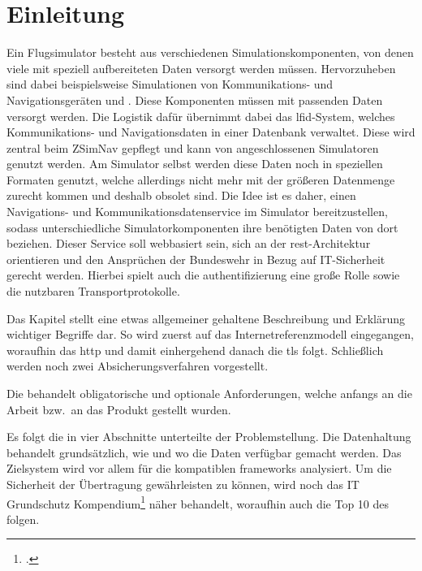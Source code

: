 \chapter{Einleitung}\label{ch:einleitung}

	Ein Flugsimulator besteht aus verschiedenen Simulationskomponenten,
	von denen viele mit speziell aufbereiteten Daten versorgt werden müssen.
	Hervorzuheben sind dabei beispielsweise Simulationen von Kommunikations- und Navigationsgeräten
	und .
	Diese Komponenten müssen mit passenden Daten versorgt werden.
	Die Logistik dafür übernimmt dabei das \gls{lfid}-System,
	welches Kommunikations- und Navigationsdaten in einer Datenbank verwaltet.
	Diese wird zentral beim \gls{ZSimNav} gepflegt
	und kann von angeschlossenen Simulatoren genutzt werden.
	Am Simulator selbst werden diese Daten noch in speziellen Formaten genutzt,
	welche allerdings nicht mehr mit der größeren Datenmenge zurecht kommen
	und deshalb obsolet sind.
	Die Idee ist es daher,
	einen Navigations- und Kommunikationsdatenservice im Simulator bereitzustellen,
	sodass unterschiedliche Simulatorkomponenten ihre benötigten Daten von dort beziehen.
	Dieser Service soll webbasiert sein,
	sich an der \gls{rest}-Architektur orientieren
	und den Ansprüchen der Bundeswehr in Bezug auf IT-Sicherheit gerecht werden.
	Hierbei spielt auch die \gls{authentifizierung} eine große Rolle
	sowie die nutzbaren Transportprotokolle.

	Das Kapitel  stellt eine etwas allgemeiner
	gehaltene Beschreibung und Erklärung wichtiger Begriffe dar.
	So wird zuerst auf das Internetreferenzmodell eingegangen,
	woraufhin das \gls{http} und damit einhergehend danach die \gls{tls} folgt.
	Schließlich werden noch zwei Absicherungsverfahren vorgestellt.

	Die  behandelt obligatorische und optionale Anforderungen,
	welche anfangs an die Arbeit bzw.\ an das Produkt gestellt wurden.

	Es folgt die in vier Abschnitte unterteilte  der Problemstellung.
	Die Datenhaltung behandelt grundsätzlich,
	wie und wo die Daten verfügbar gemacht werden.
	Das Zielsystem wird vor allem für die kompatiblen \glspl{framework} analysiert.
	Um die Sicherheit der Übertragung gewährleisten zu können,
	wird noch das IT Grundschutz Kompendium\footcite[Vgl.][]{holgerschildt2022} näher behandelt,
	woraufhin auch die Top 10 des  folgen.

